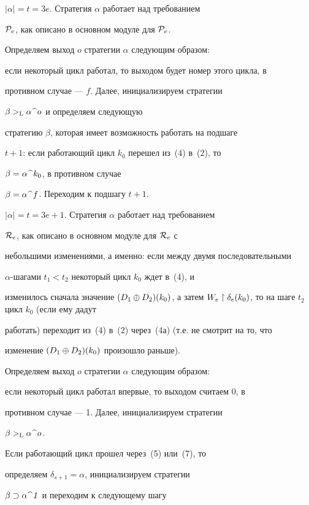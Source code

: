  


$|\alpha|=t=3e$. Стратегия $\alpha$ работает над требованием


${\cal P}_e$, как описано в основном модуле для ${\cal P}_e$.


Определяем выход $o$ стратегии $\alpha$ следующим образом:


если некоторый цикл работал, то выходом будет номер этого цикла, в


противном случае --- $f$. Далее, инициализируем стратегии


$\beta>_{\mathrm L}\alpha\,\widehat{\ }\,o$ и определяем следующую


стратегию $\beta$, которая имеет возможность работать на подшаге 


$t+1$: если работающий цикл $k_0$ перешел из~(4) в~(2), то 


$\beta=\alpha\,\widehat{\ }\,k_0$, в противном случае 


$\beta=\alpha\,\widehat{\ }\,f$. Переходим к подшагу $t+1$.





$|\alpha|=t=3e+1$. Стратегия $\alpha$ работает над требованием


${\cal R}_e$, как описано в основном модуле для ${\cal R}_e$ с


небольшими изменениями, а именно: если между двумя последовательными


$\alpha$-шагами $t_1<t_2$ некоторый цикл $k_0$ ждет в~(4), и


изменилось сначала значение $\dsum(k_0)$, а затем $W_e\rst


\delta_e(k_0)$, то на шаге $t_2$ цикл $k_0$ (если ему дадут


работать) переходит из~(4) в~(2) через~(4а) (т.е. не смотрит на то, что


изменение $(D_1\oplus D_2)(k_0)$ произошло раньше).


Определяем выход $o$ стратегии $\alpha$ следующим образом:


если некоторый цикл работал впервые, то выходом считаем 0, в


противном случае --- 1. Далее, инициализируем стратегии


$\beta>_{\mathrm L}\alpha\,\widehat{\ }\,o$. 


Если работающий цикл прошел через~(5) или~(7), то


определяем $\delta_{s+1}=\alpha$, инициализируем стратегии


$\beta\supset\alpha\,\widehat{\ }\,{\it 1}$ и переходим к следующему шагу


